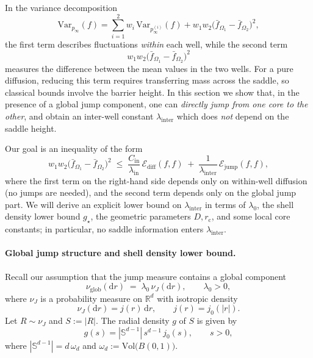 In the variance decomposition
\begin{equation}\label{eq:Var-decomp}
\mathrm{Var}_{p_\infty}(f)
=
\sum_{i=1}^2 w_i\,\mathrm{Var}_{p_\infty^{(i)}}(f)
+
w_1w_2\bigl(\bar f_{\Omega_1}-\bar f_{\Omega_2}\bigr)^2,
\end{equation}
the first term describes fluctuations \emph{within} each well, while the second term
\[
w_1w_2\bigl(\bar f_{\Omega_1}-\bar f_{\Omega_2}\bigr)^2
\]
measures the difference between the mean values in the two wells.
For a pure diffusion, reducing this term requires transferring mass across the saddle,
so classical bounds involve the barrier height.
In this section we show that, in the presence of a global jump component,
one can \emph{directly jump from one core to the other}, and obtain an
inter-well constant \(\lambda_{\mathrm{inter}}\) which does \emph{not} depend on the saddle height.

Our goal is an inequality of the form
\begin{equation}\label{eq:between-goal}
w_1w_2\bigl(\bar f_{\Omega_1}-\bar f_{\Omega_2}\bigr)^2
\;\le\;
\frac{C_{\mathrm{in}}}{\lambda_{\mathrm{in}}}\,\mathcal E_{\mathrm{diff}}(f,f)
\;+\;
\frac{1}{\lambda_{\mathrm{inter}}}\,\mathcal E_{\mathrm{jump}}(f,f),
\end{equation}
where the first term on the right-hand side depends only on within-well diffusion
(no jumps are needed), and the second term depends only on the global jump part.
We will derive an explicit lower bound on \(\lambda_{\mathrm{inter}}\) in terms of
\(\lambda_0\), the shell density lower bound \(g_\star\), the geometric parameters
\(D,r_{\mathrm c}\), and some local core constants; in particular, no saddle
information enters \(\lambda_{\mathrm{inter}}\).

\paragraph{Global jump structure and shell density lower bound.}
Recall our assumption that the jump measure contains a global component
\[
\nu_{\mathrm{glob}}(\mathrm dr) \;=\; \lambda_0\,\nu_J(\mathrm dr),
\qquad \lambda_0>0,
\]
where \(\nu_J\) is a probability measure on \(\mathbb R^d\) with isotropic density
\[
\nu_J(\mathrm dr)=j(r)\,\mathrm dr,
\qquad
j(r)=j_0(|r|).
\]
Let \(R\sim\nu_J\) and \(S:=|R|\).
The radial density \(g\) of \(S\) is given by
\[
g(s)=|\mathbb S^{d-1}|\,s^{d-1}\,j_0(s),
\qquad s>0,
\]
where \(|\mathbb S^{d-1}|=d\,\omega_d\) and \(\omega_d:=\mathrm{Vol}\bigl(B(0,1)\bigr)\).


